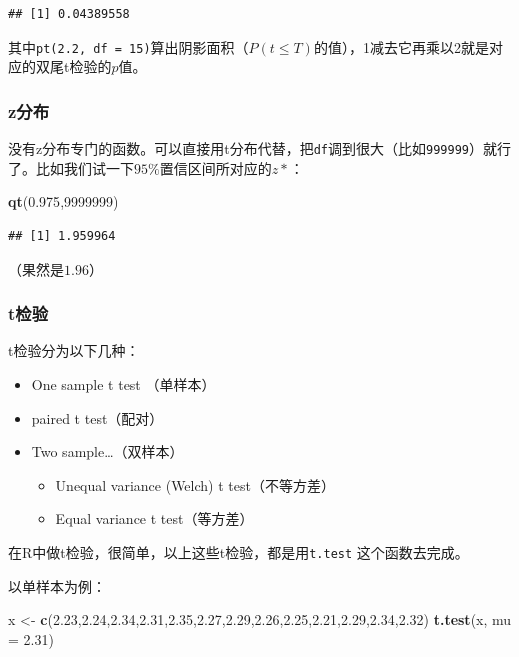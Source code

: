 \documentclass[]{book}
\newenvironment{Shaded}{\begin{snugshade}}{\end{snugshade}}
\newcommand{\DataTypeTok}[1]{\textcolor[rgb]{0.13,0.29,0.53}{#1}}
\newcommand{\DecValTok}[1]{\textcolor[rgb]{0.00,0.00,0.81}{#1}}
\newcommand{\FloatTok}[1]{\textcolor[rgb]{0.00,0.00,0.81}{#1}}
\newcommand{\KeywordTok}[1]{\textcolor[rgb]{0.13,0.29,0.53}{\textbf{#1}}}
\newcommand{\NormalTok}[1]{#1}
\newcommand{\StringTok}[1]{\textcolor[rgb]{0.31,0.60,0.02}{#1}}
\providecommand{\tightlist}{%
  \setlength{\itemsep}{0pt}\setlength{\parskip}{0pt}}
\begin{document}
\begin{verbatim}
## [1] 0.04389558
\end{verbatim}

其中\texttt{pt(2.2,\ df\ =\ 15)}算出阴影面积（\(P(t≤T)\)的值），1减去它再乘以2就是对应的双尾t检验的\(p\)值。

\hypertarget{z-dist}{%
\subsubsection{z分布}\label{z-dist}}

没有z分布专门的函数。可以直接用t分布代替，把\texttt{df}调到很大（比如\texttt{999999}）就行了。比如我们试一下\(95\%\)置信区间所对应的\(z*\)：

\begin{Shaded}
\begin{Highlighting}[]
\KeywordTok{qt}\NormalTok{(}\FloatTok{0.975}\NormalTok{,}\DecValTok{9999999}\NormalTok{)}
\end{Highlighting}
\end{Shaded}

\begin{verbatim}
## [1] 1.959964
\end{verbatim}

（果然是\(1.96\)）

\hypertarget{t-test}{%
\subsubsection{t检验}\label{t-test}}

t检验分为以下几种：

\begin{itemize}
\tightlist
\item
  One sample t test （单样本）
\item
  paired t test（配对）
\item
  Two sample\ldots{}（双样本）

  \begin{itemize}
  \tightlist
  \item
    Unequal variance (Welch) t test（不等方差）
  \item
    Equal variance t test（等方差）
  \end{itemize}
\end{itemize}

在R中做t检验，很简单，以上这些t检验，都是用\texttt{t.test} 这个函数去完成。

以单样本为例：

\begin{Shaded}
\begin{Highlighting}[]
\NormalTok{x <-}\StringTok{ }\KeywordTok{c}\NormalTok{(}\FloatTok{2.23}\NormalTok{,}\FloatTok{2.24}\NormalTok{,}\FloatTok{2.34}\NormalTok{,}\FloatTok{2.31}\NormalTok{,}\FloatTok{2.35}\NormalTok{,}\FloatTok{2.27}\NormalTok{,}\FloatTok{2.29}\NormalTok{,}\FloatTok{2.26}\NormalTok{,}\FloatTok{2.25}\NormalTok{,}\FloatTok{2.21}\NormalTok{,}\FloatTok{2.29}\NormalTok{,}\FloatTok{2.34}\NormalTok{,}\FloatTok{2.32}\NormalTok{)}
\KeywordTok{t.test}\NormalTok{(x, }\DataTypeTok{mu =} \FloatTok{2.31}\NormalTok{)}
\end{Highlighting}
\end{Shaded}
\end{document}
